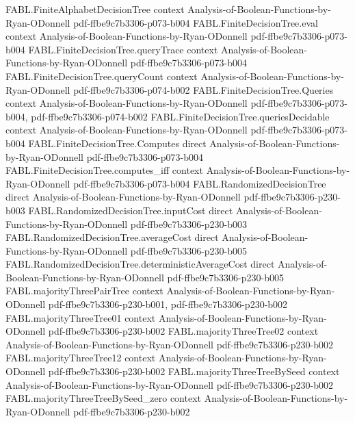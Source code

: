 \begin{theorem}
\proofstep
  {FABL.FiniteAlphabetDecisionTree}
  {context}
  {Analysis-of-Boolean-Functions-by-Ryan-ODonnell}
  {pdf-ffbe9c7b3306-p073-b004}
\proofstep
  {FABL.FiniteDecisionTree.eval}
  {context}
  {Analysis-of-Boolean-Functions-by-Ryan-ODonnell}
  {pdf-ffbe9c7b3306-p073-b004}
\proofstep
  {FABL.FiniteDecisionTree.queryTrace}
  {context}
  {Analysis-of-Boolean-Functions-by-Ryan-ODonnell}
  {pdf-ffbe9c7b3306-p073-b004}
\proofstep
  {FABL.FiniteDecisionTree.queryCount}
  {context}
  {Analysis-of-Boolean-Functions-by-Ryan-ODonnell}
  {pdf-ffbe9c7b3306-p074-b002}
\proofstep
  {FABL.FiniteDecisionTree.Queries}
  {context}
  {Analysis-of-Boolean-Functions-by-Ryan-ODonnell}
  {pdf-ffbe9c7b3306-p073-b004,
    pdf-ffbe9c7b3306-p074-b002}
\proofstep
  {FABL.FiniteDecisionTree.queriesDecidable}
  {context}
  {Analysis-of-Boolean-Functions-by-Ryan-ODonnell}
  {pdf-ffbe9c7b3306-p073-b004}
\proofstep
  {FABL.FiniteDecisionTree.Computes}
  {direct}
  {Analysis-of-Boolean-Functions-by-Ryan-ODonnell}
  {pdf-ffbe9c7b3306-p073-b004}
\proofstep
  {FABL.FiniteDecisionTree.computes_iff}
  {context}
  {Analysis-of-Boolean-Functions-by-Ryan-ODonnell}
  {pdf-ffbe9c7b3306-p073-b004}
\proofstep
  {FABL.RandomizedDecisionTree}
  {direct}
  {Analysis-of-Boolean-Functions-by-Ryan-ODonnell}
  {pdf-ffbe9c7b3306-p230-b003}
\proofstep
  {FABL.RandomizedDecisionTree.inputCost}
  {direct}
  {Analysis-of-Boolean-Functions-by-Ryan-ODonnell}
  {pdf-ffbe9c7b3306-p230-b003}
\proofstep
  {FABL.RandomizedDecisionTree.averageCost}
  {direct}
  {Analysis-of-Boolean-Functions-by-Ryan-ODonnell}
  {pdf-ffbe9c7b3306-p230-b005}
\proofstep
  {FABL.RandomizedDecisionTree.deterministicAverageCost}
  {direct}
  {Analysis-of-Boolean-Functions-by-Ryan-ODonnell}
  {pdf-ffbe9c7b3306-p230-b005}
\proofstep
  {FABL.majorityThreePairTree}
  {context}
  {Analysis-of-Boolean-Functions-by-Ryan-ODonnell}
  {pdf-ffbe9c7b3306-p230-b001,
    pdf-ffbe9c7b3306-p230-b002}
\proofstep
  {FABL.majorityThreeTree01}
  {context}
  {Analysis-of-Boolean-Functions-by-Ryan-ODonnell}
  {pdf-ffbe9c7b3306-p230-b002}
\proofstep
  {FABL.majorityThreeTree02}
  {context}
  {Analysis-of-Boolean-Functions-by-Ryan-ODonnell}
  {pdf-ffbe9c7b3306-p230-b002}
\proofstep
  {FABL.majorityThreeTree12}
  {context}
  {Analysis-of-Boolean-Functions-by-Ryan-ODonnell}
  {pdf-ffbe9c7b3306-p230-b002}
\proofstep
  {FABL.majorityThreeTreeBySeed}
  {context}
  {Analysis-of-Boolean-Functions-by-Ryan-ODonnell}
  {pdf-ffbe9c7b3306-p230-b002}
\proofstep
  {FABL.majorityThreeTreeBySeed_zero}
  {context}
  {Analysis-of-Boolean-Functions-by-Ryan-ODonnell}
  {pdf-ffbe9c7b3306-p230-b002}

\end{theorem}
